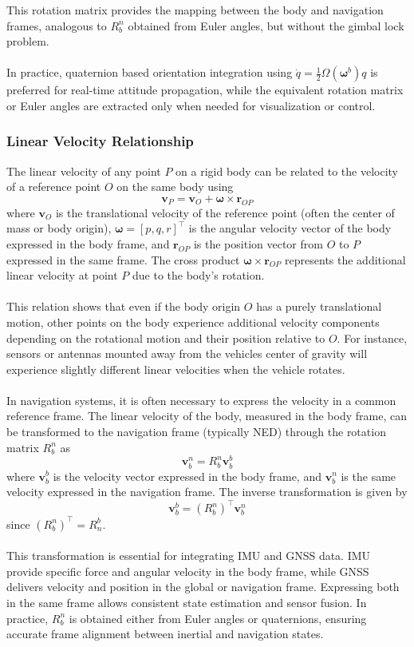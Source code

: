 This rotation matrix provides the mapping between the body and navigation frames, analogous to $R_b^n$ obtained from Euler angles, but without the gimbal lock problem.  
\\ \\
In practice, quaternion based orientation integration using $\dot{q} = \frac{1}{2}\Omega(\boldsymbol{\omega}^b)q$ is preferred for real-time attitude propagation, while the equivalent rotation matrix or Euler angles are extracted only when needed for visualization or control.



\subsubsection{Linear Velocity Relationship}
The linear velocity of any point $P$ on a rigid body can be related to the velocity of a reference point $O$ on the same body using
$$
    \mathbf{v}_P = \mathbf{v}_O + \boldsymbol{\omega} \times \mathbf{r}_{OP}
$$
where $\mathbf{v}_O$ is the translational velocity of the reference point (often the center of mass or body origin), $\boldsymbol{\omega} = [p, q, r]^\top$ is the angular velocity vector of the body expressed in the body frame, and $\mathbf{r}_{OP}$ is the position vector from $O$ to $P$ expressed in the same frame. The cross product $\boldsymbol{\omega} \times \mathbf{r}_{OP}$ represents the additional linear velocity at point $P$ due to the body's rotation.  
\\ \\
This relation shows that even if the body origin $O$ has a purely translational motion, other points on the body experience additional velocity components depending on the rotational motion and their position relative to $O$. For instance, sensors or antennas mounted away from the vehicles center of gravity will experience slightly different linear velocities when the vehicle rotates.
\\ \\
In navigation systems, it is often necessary to express the velocity in a common reference frame. The linear velocity of the body, measured in the body frame, can be transformed to the navigation frame (typically NED) through the rotation matrix $R_b^n$ as
$$
    \mathbf{v}_b^n = R_b^n \mathbf{v}_b^b
$$
where $\mathbf{v}_b^b$ is the velocity vector expressed in the body frame, and $\mathbf{v}_b^n$ is the same velocity expressed in the navigation frame. The inverse transformation is given by
$$
    \mathbf{v}_b^b = (R_b^n)^\top \mathbf{v}_b^n
$$
since $(R_b^n)^\top = R_n^b$.  
\\ \\
This transformation is essential for integrating IMU and GNSS data. IMU provide specific force and angular velocity in the body frame, while GNSS delivers velocity and position in the global or navigation frame. Expressing both in the same frame allows consistent state estimation and sensor fusion. In practice, $R_b^n$ is obtained either from Euler angles or quaternions, ensuring accurate frame alignment between inertial and navigation states.




